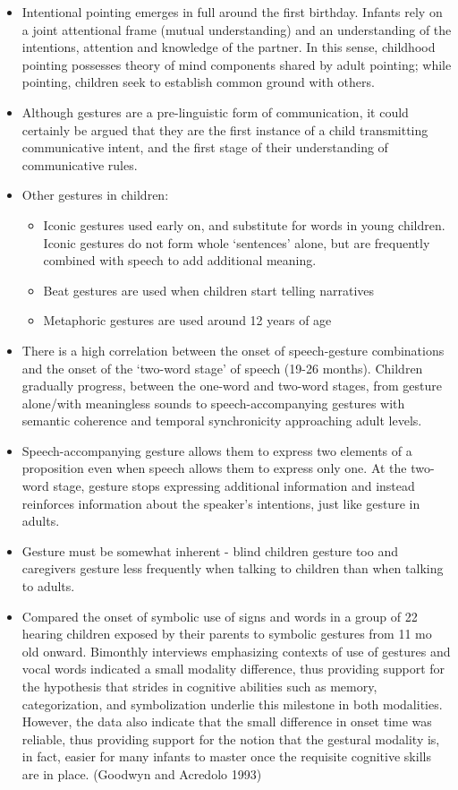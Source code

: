 \documentclass{article}
\begin{document}
\begin{itemize}
    \item Intentional pointing emerges in full around the first birthday. Infants rely on a joint attentional frame (mutual understanding) and an understanding of the intentions, attention and knowledge of the partner. In this sense, childhood pointing possesses theory of mind components shared by adult pointing; while pointing, children seek to establish common ground with others. 
    \item Although gestures are a pre-linguistic form of communication, it could certainly be argued that they are the first instance of a child transmitting communicative intent, and the first stage of their understanding of communicative rules.
    \item Other gestures in children:
    \begin{itemize}
        \item Iconic gestures used early on, and substitute for words in young children. Iconic gestures do not form whole `sentences' alone, but are frequently combined with speech to add additional meaning.
        \item Beat gestures are used when children start telling narratives
        \item Metaphoric gestures are used around 12 years of age
    \end{itemize}
    \item There is a high correlation between the onset of speech-gesture combinations and the onset of the `two-word stage' of speech (19-26 months). Children gradually progress, between the one-word and two-word stages, from gesture alone/with meaningless sounds to speech-accompanying gestures with semantic coherence and temporal synchronicity approaching adult levels.
    \item Speech-accompanying gesture allows them to express two elements of a proposition even when speech allows them to express only one. At the two-word stage, gesture stops expressing additional information and instead reinforces information about the speaker's intentions, just like gesture in adults.
    \item Gesture must be somewhat inherent - blind children gesture too and caregivers gesture less frequently when talking to children than when talking to adults.
    \item Compared the onset of symbolic use of signs and words in a group of 22 hearing children exposed by their parents to symbolic gestures from 11 mo old onward. Bimonthly interviews emphasizing contexts of use of gestures and vocal words indicated a small modality difference, thus providing support for the hypothesis that strides in cognitive abilities such as memory, categorization, and symbolization underlie this milestone in both modalities. However, the data also indicate that the small difference in onset time was reliable, thus providing support for the notion that the gestural modality is, in fact, easier for many infants to master once the requisite cognitive skills are in place. (Goodwyn and Acredolo 1993)

\end{itemize}
\end{document}
